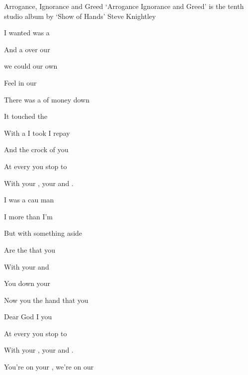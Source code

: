 \begin{SBSong}{Arrogance, Ignorance and Greed}
  {`Arrogance Ignorance and Greed' is the tenth studio album by `Show of Hands'}
  {Steve Knightley}
  \begin{SBVerse}
     I wanted was a  

    And a  over our 

     we could  our own

    Feel  in our 

    There was a  of money  down

    It  touched the 

    With a  I took I  repay

    And the crock of  you  
  \end{SBVerse}

  \begin{SBChorus}
     At every  you stop to 

    With your , your  and .
  \end{SBChorus}
  \begin{SBVerse}
    I  was a cau man

    I  more than I'm 

    But  with something  aside

    Are the  that you 

    With your  and 

    You  down your 

    Now you  the hand that  you

    Dear God I  you  
  \end{SBVerse}
  \begin{SBChorus}
     At every  you stop to 

    With your , your  and .

     You're on your , we're on our 


\end{SBChorus}
\end{SBSong}
